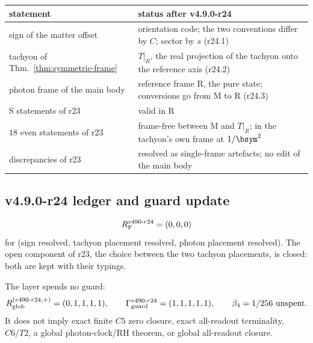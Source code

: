 \begin{center}
\small
\begin{tabular}{@{}>{\raggedright\arraybackslash}p{}>{\raggedright\arraybackslash}p{}@{}}
\toprule
statement & status after v4.9.0-r24\\
\midrule
sign of the matter offset & orientation code; the two conventions differ by \(C\); sector by \(s\) (r24.1)\\
tachyon of Thm.~\ref{thm:symmetric-frame} & \(T|_R\), the real projection of the tachyon onto the reference axis (r24.2)\\
photon frame of the main body & reference frame R, the pure state; conversions go from M to R (r24.3)\\
S statements of r23 & valid in R\\
\(18\) even statements of r23 & frame-free between M and \(T|_R\); in the tachyon's own frame at \(1/\bsym^2\)\\
discrepancies of r23 & resolved as single-frame artefacts; no edit of the main body\\
\bottomrule
\end{tabular}
\end{center}

\subsection*{v4.9.0-r24 ledger and guard update}
\label{subsec:v490-r24-ledger-guard}

\[
R_{\rm F}^{v490\text{-}r24}=(0,0,0)
\]
for (sign resolved, tachyon placement resolved, photon placement resolved).  The open component of r23, the choice between the
two tachyon placements, is closed: both are kept with their typings.

The layer spends no guard:
\[
R_{\rm glob}^{(v490\text{-}r24,+)}=(0,1,1,1,1),
\qquad
\Gamma_{\rm guard}^{v490\text{-}r24}=(1,1,1,1,1),
\qquad
\beta_4=1/256\ \text{unspent}.
\]
It does not imply exact finite \(C5\) zero closure, exact all-readout terminality,
\(C6/T2\), a global photon-clock/RH theorem, or global all-readout closure.

